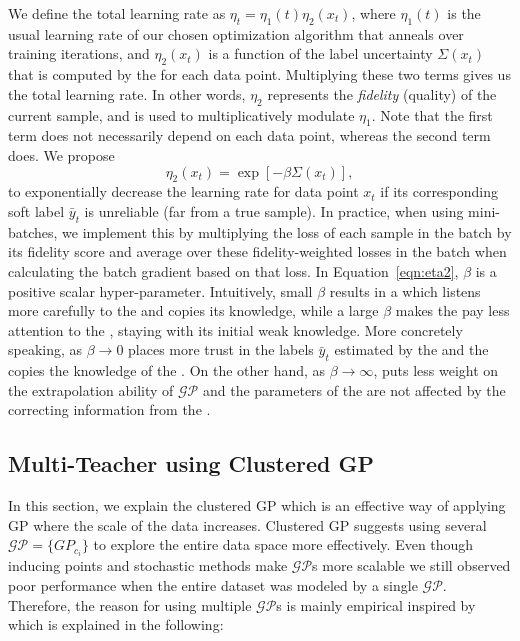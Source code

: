 We define the total learning rate as $\eta_t = \eta_1(t)\eta_2(x_t)$, where $\eta_1(t)$ is the usual learning rate of our chosen optimization algorithm that anneals over training iterations, and $\eta_2(x_t)$ is a function of the label uncertainty $\Sigma(x_t)$ that is computed by the \tch for each data point. Multiplying these two terms gives us the total learning rate. In other words, $\eta_2$ represents the \emph{fidelity} (quality) of the current sample, and is used to multiplicatively modulate $\eta_1$. Note that the first term does not necessarily depend on each data point, whereas the second term does. We propose
\begin{equation}
 \label{eqn:eta2}
 \eta_2(x_t) = \exp[-\beta \Sigma(x_t)],    
\end{equation}
to exponentially decrease the learning rate for data point $x_t$ if its corresponding soft label $\bar{y}_t$ is unreliable (far from a true sample).
In practice, when using mini-batches, we implement this by multiplying the loss of each sample in the batch by its fidelity score and average over these fidelity-weighted losses in the batch when calculating the batch gradient based on that loss. In Equation~\ref{eqn:eta2}, $\beta$ is a positive scalar hyper-parameter. Intuitively, small $\beta$ results in a \std which listens more carefully to the \tch and copies its knowledge, while a large $\beta$ makes the \std pay less attention to the \tch, staying with its initial weak knowledge. 
More concretely speaking, as $\beta \to 0$ \std places more trust in the labels $\bar{y}_t$ estimated by the \tch and the \std copies the knowledge of the \tch. On the other hand, as $\beta \to \infty$, \std puts less weight on the extrapolation ability of $\mathcal{GP}$ and the parameters of the \std are not affected by the correcting information from the \tch. 


\subsection{Multi-Teacher \fwl using Clustered GP}
\label{sec:CGP}
In this section, we explain the clustered GP which is an effective way of applying GP where the scale of the data increases.  Clustered GP suggests using several $\mathcal{GP}=\{GP_{c_i}\}$ to explore the entire data space more effectively. Even though inducing points and stochastic methods make $\mathcal{GP}$s more scalable we still observed poor performance when the entire dataset was modeled by a single $\mathcal{GP}$. Therefore, the reason for using multiple $\mathcal{GP}$s is mainly empirical inspired by ~\citep{shen2006fast} which is explained in the following:

